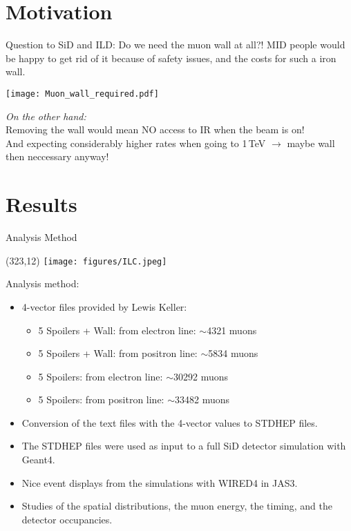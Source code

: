 \documentclass[xcolor={dvipsnames}]{beamer}
\newcommand{\ilclogo}{
  \setlength{\TPHorizModule}{1pt}
  \setlength{\TPVertModule}{1pt}
  \begin{textblock}{1}(323,12)
   \texttt{[image: figures/ILC.jpeg]}
  \end{textblock}
}
\begin{document}
\section{Motivation}
\begin{frame}{}
Question to SiD and ILD: Do we need the muon wall at all?!
MID people would be happy to get rid of it because of safety issues, and the costs for such a iron wall.
\begin{center}
\texttt{[image: Muon\_wall\_required.pdf]}
\end{center}
\textit{On the other hand:}\\
Removing the wall would mean NO access to IR when the beam is on!\\
And expecting considerably higher rates when going to 1\,TeV $\rightarrow$ maybe wall then neccessary anyway!
\end{frame}

\section{Results}
\begin{frame}{Analysis Method}
\ilclogo
Analysis method:
\begin{itemize}
\item 4-vector files provided by Lewis Keller:
\begin{itemize}
 \item 5 Spoilers + Wall: from electron line: $\sim$4321 muons
 \item 5 Spoilers + Wall: from positron line: $\sim$5834 muons
 \item 5 Spoilers: from electron line: $\sim$30292 muons
 \item 5 Spoilers: from positron line: $\sim$33482 muons
\end{itemize}
\item Conversion of the text files with the 4-vector values to  STDHEP files.
\item The STDHEP files were used as input to a full SiD detector simulation with Geant4.
\item Nice event displays from the simulations with WIRED4 in JAS3.
\item Studies of the spatial distributions, the muon energy, the timing, and the detector occupancies.
\end{itemize}

\end{frame}
\end{document}
